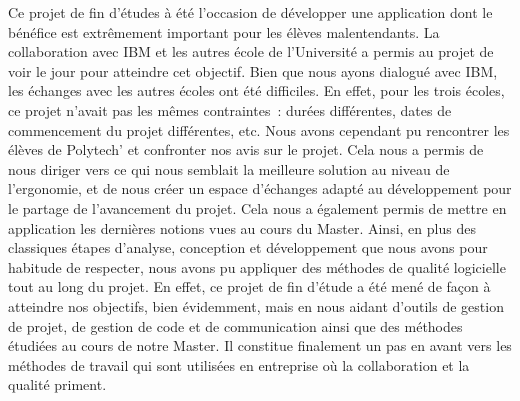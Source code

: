 \documentclass[a4paper,11pt]{report}
\begin{document}
Ce projet de fin d'études à été l'occasion de développer une application dont le bénéfice est extrêmement important pour les élèves malentendants.
La collaboration avec IBM et les autres école de l'Université a permis au projet de voir le jour pour atteindre cet objectif.
Bien que nous ayons dialogué avec IBM, les échanges avec les autres écoles ont été difficiles.
En effet, pour les trois écoles, ce projet n'avait pas les mêmes contraintes~: durées différentes, dates de commencement du projet différentes, etc.
Nous avons cependant pu rencontrer les élèves de Polytech' et confronter nos avis sur le projet.
Cela nous a permis de nous diriger vers ce qui nous semblait la meilleure solution au niveau de l'ergonomie, et de nous créer un espace d'échanges adapté au développement pour le partage de l'avancement du projet.
\medskip
Cela nous a également permis de mettre en application les dernières notions vues au cours du Master.
Ainsi, en plus des classiques étapes d'analyse, conception et développement que nous avons pour habitude de respecter, nous avons pu appliquer des méthodes de qualité logicielle tout au long du projet.
En effet, ce projet de fin d'étude a été mené de façon à atteindre nos objectifs, bien évidemment, mais en nous aidant d'outils de gestion de projet, de gestion de code et de communication ainsi que des méthodes étudiées au cours de notre Master.
\medskip
Il constitue finalement un pas en avant vers les méthodes de travail qui sont utilisées en entreprise où la collaboration et la qualité priment.


\listoffigures   


\end{document}
